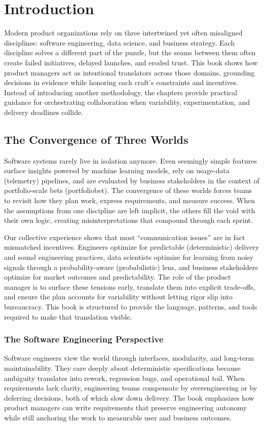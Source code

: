 \chapter{Introduction}
\label{ch:introduction}

Modern product organizations rely on three intertwined yet often misaligned disciplines: software engineering, data science, and business strategy. Each discipline solves a different part of the puzzle, but the seams between them often create failed initiatives, delayed launches, and eroded trust. This book shows how product managers act as intentional translators across those domains, grounding decisions in evidence while honoring each craft's constraints and incentives. Instead of introducing another methodology, the chapters provide practical guidance for orchestrating collaboration when variability, experimentation, and delivery deadlines collide.

\section{The Convergence of Three Worlds}
\label{sec:convergence}

Software systems rarely live in isolation anymore. Even seemingly simple features surface insights powered by machine learning models, rely on usage-data (\gls{telemetry}) pipelines, and are evaluated by business stakeholders in the context of portfolio-scale bets (\gls{portfoliobet}). The convergence of these worlds forces teams to revisit how they plan work, express requirements, and measure success. When the assumptions from one discipline are left implicit, the others fill the void with their own logic, creating misinterpretations that compound through each sprint.

Our collective experience shows that most ``communication issues'' are in fact mismatched incentives. Engineers optimize for predictable (\gls{deterministic}) delivery and sound engineering practices, data scientists optimize for learning from noisy signals through a probability-aware (\gls{probabilistic}) lens, and business stakeholders optimize for market outcomes and predictability. The role of the product manager is to surface these tensions early, translate them into explicit trade-offs, and ensure the plan accounts for variability without letting rigor slip into bureaucracy. This book is structured to provide the language, patterns, and tools required to make that translation visible.

\subsection{The Software Engineering Perspective}
Software engineers view the world through interfaces, modularity, and long-term maintainability. They care deeply about deterministic specifications because ambiguity translates into rework, regression bugs, and operational toil. When requirements lack clarity, engineering teams compensate by overengineering or by deferring decisions, both of which slow down delivery. The book emphasizes how product managers can write requirements that preserve engineering autonomy while still anchoring the work to measurable user and business outcomes.

